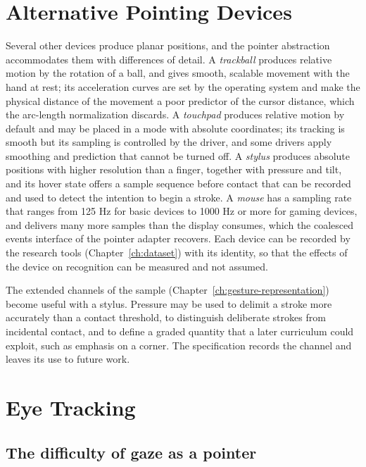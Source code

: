 \chapter{Alternative Pointing Devices}\label{ch:pointing-devices}

Several other devices produce planar positions, and the pointer abstraction accommodates them with differences of detail. A \emph{trackball} produces relative motion by the rotation of a ball, and gives smooth, scalable movement with the hand at rest; its acceleration curves are set by the operating system and make the physical distance of the movement a poor predictor of the cursor distance, which the arc-length normalization discards. A \emph{touchpad} produces relative motion by default and may be placed in a mode with absolute coordinates; its tracking is smooth but its sampling is controlled by the driver, and some drivers apply smoothing and prediction that cannot be turned off. A \emph{stylus} produces absolute positions with higher resolution than a finger, together with pressure and tilt, and its hover state offers a sample sequence before contact that can be recorded and used to detect the intention to begin a stroke. A \emph{mouse} has a sampling rate that ranges from 125 Hz for basic devices to 1000 Hz or more for gaming devices, and delivers many more samples than the display consumes, which the coalesced events interface of the pointer adapter recovers. Each device can be recorded by the research tools (Chapter~\ref{ch:dataset}) with its identity, so that the effects of the device on recognition can be measured and not assumed.

The extended channels of the sample (Chapter~\ref{ch:gesture-representation}) become useful with a stylus. Pressure may be used to delimit a stroke more accurately than a contact threshold, to distinguish deliberate strokes from incidental contact, and to define a graded quantity that a later curriculum could exploit, such as emphasis on a corner. The specification records the channel and leaves its use to future work.

\chapter{Eye Tracking}\label{ch:eye-tracking}

\section{The difficulty of gaze as a pointer}

